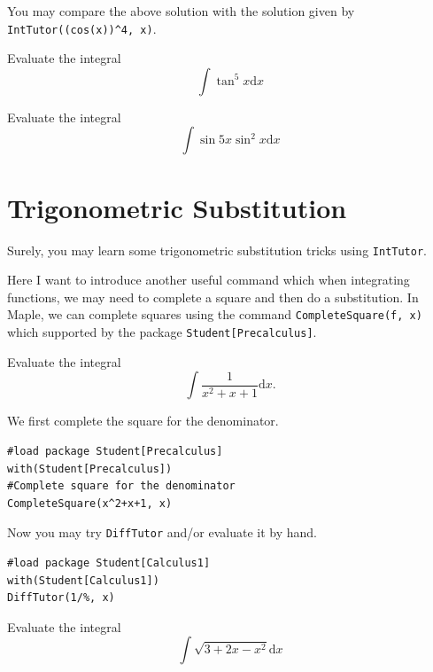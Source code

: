 \documentclass[]{book}
\theoremstyle{definition}
\theoremstyle{definition}
\theoremstyle{definition}
\theoremstyle{remark}
\let\BeginKnitrBlock\begin \let\EndKnitrBlock\end
\begin{document}
You may compare the above solution with the solution given by \texttt{IntTutor((cos(x))\^{}4,\ x)}.

\BeginKnitrBlock{exercise}
\protect\hypertarget{exr:unnamed-chunk-3}{}{\label{exr:unnamed-chunk-3} }
Evaluate the integral
\[
\int \tan ^{5} x \mathrm{d} x
\]
\EndKnitrBlock{exercise}

\BeginKnitrBlock{exercise}
\protect\hypertarget{exr:unnamed-chunk-4}{}{\label{exr:unnamed-chunk-4} }
Evaluate the integral
\[
\int \sin 5 x \sin^2 x \mathrm{d} x
\]
\EndKnitrBlock{exercise}

\hypertarget{trigonometric-substitution}{%
\section{Trigonometric Substitution}\label{trigonometric-substitution}}

Surely, you may learn some trigonometric substitution tricks using \texttt{IntTutor}.

Here I want to introduce another useful command which when integrating functions, we may need to complete a square and then do a substitution. In Maple, we can complete squares using the command \texttt{CompleteSquare(f,\ x)} which supported by the package \texttt{Student{[}Precalculus{]}}.

\BeginKnitrBlock{example}
\protect\hypertarget{exm:unnamed-chunk-5}{}{\label{exm:unnamed-chunk-5} }
Evaluate the integral
\[
\int\dfrac{1}{x^2+x+1} \mathrm{d} x.
\]
\EndKnitrBlock{example}

\BeginKnitrBlock{solution}
{}

We first complete the square for the denominator.

\begin{verbatim}
#load package Student[Precalculus]
with(Student[Precalculus])
#Complete square for the denominator
CompleteSquare(x^2+x+1, x)
\end{verbatim}

Now you may try \texttt{DiffTutor} and/or evaluate it by hand.

\begin{verbatim}
#load package Student[Calculus1]
with(Student[Calculus1])
DiffTutor(1/%, x)
\end{verbatim}
\EndKnitrBlock{solution}

\BeginKnitrBlock{exercise}
\protect\hypertarget{exr:unnamed-chunk-7}{}{\label{exr:unnamed-chunk-7} }
Evaluate the integral
\[
\int \sqrt{3+2 x-x^{2}} \mathrm{d} x
\]
\EndKnitrBlock{exercise}
\end{document}
